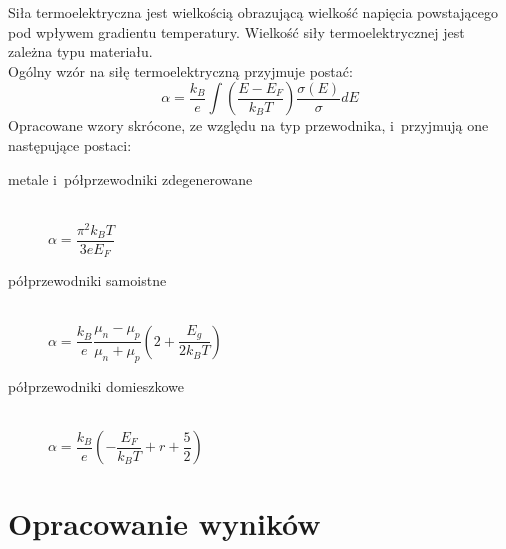 \documentclass[a4paper,12pt]{article}
\begin{document}
Siła termoelektryczna jest wielkością obrazującą wielkość napięcia powstającego pod wpływem gradientu temperatury.
Wielkość siły termoelektrycznej jest zależna typu materiału.\\
Ogólny wzór na siłę termoelektryczną przyjmuje postać:
$$\alpha=\dfrac{k_B}{e}\int\left(\dfrac{E-E_F}{k_BT}\right)\dfrac{\sigma(E)}{\sigma}dE$$
Opracowane wzory skrócone, ze względu na typ przewodnika, i~przyjmują one następujące postaci:
\begin{description}
\item[metale i~półprzewodniki zdegenerowane]\hfill \\
	$\alpha=\dfrac{\pi^2k_BT}{3eE_F}$
\item[półprzewodniki samoistne]\hfill \\
$\alpha=\dfrac{k_B}{e}\dfrac{\mu_n-\mu_p}{\mu_n+\mu_p}\left(2+\dfrac{E_g}{2k_BT}\right)$
\item[półprzewodniki domieszkowe]\hfill \\
$\alpha=\dfrac{k_B}{e}\left(-\dfrac{E_F}{k_BT}+r+\dfrac{5}{2}\right)$
\end{description}
\section{Opracowanie wyników}
\end{document}
